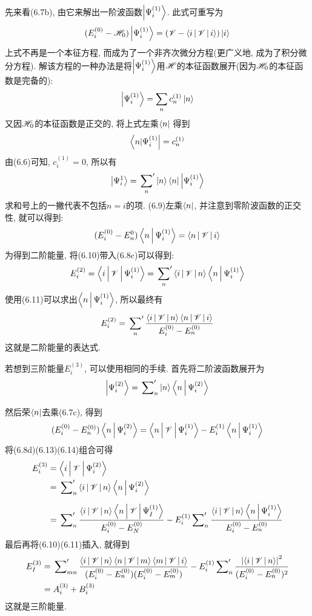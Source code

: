先来看(6.7b), 由它来解出一阶波函数$\Ket{\Psi_i^{(1)}}$. 此式可重写为
\begin{align}
(E_i^{(0)} - \mathscr{H}_0 )\Ket{\Psi_i^{(1)}} = (\mathscr{V} - \Braket{i|\mathscr{V}|i})\Ket{i}
\end{align}
上式不再是一个本征方程, 而成为了一个非齐次微分方程(更广义地, 成为了积分微分方程). 解该方程的一种办法是将$\Ket{\Psi_i^{(1)}}$用$\mathscr{H}$的本征函数展开(因为$\mathscr{H}_0$的本征函数是完备的):
\begin{align*}
\Ket{\Psi_i^{(1)}} = \sum_n c_n^{(1)}\Ket{n}
\end{align*}
又因$\mathscr{H}_0$的本征函数是正交的, 将上式左乘$\Bra{n}$ 得到
\begin{align*}
\Bra{n|\Psi_i^{(1)}} = c_n^{(1)}
\end{align*}
由(6.6)可知, $c_i^{(1)}=0$, 所以有
\begin{align}
\Ket{\Psi_i^{1}} = \sideset{}{'}\sum_n\Ket{n}\Bra{n}\Ket{\Psi_i^{(1)}}
\end{align}
求和号上的一撇代表不包括$n=i$的项. (6.9)左乘$\Bra{n}$, 并注意到零阶波函数的正交性, 就可以得到:
\begin{align}
(E_i^{(0)} - E_n^{0} )\Braket{n|\Psi_i^{(1)}} = \Braket{n|\mathscr{V}|i}
\end{align}
为得到二阶能量, 将(6.10)带入(6.8c)可以得到:
\begin{align*}
E_i^{(2)} = \Braket{i|\mathscr{V}|\Psi_i^{(1)}} = \sideset{}{'}\sum_n\Braket{i|\mathscr{V}|n}\Braket{n|\Psi_i^{(1)}}
\end{align*}
使用(6.11)可以求出$\Braket{n|\Psi_i^{(1)}}$, 所以最终有
\begin{align}
E_i^{(2)} = \sideset{}{'}\sum_n\frac{\Braket{i|\mathscr{V}|n}\Braket{n|\mathscr{V}|i}}{E_i^{(0)} - E_n^{(0)}}
\end{align}
这就是二阶能量的表达式.

若想到三阶能量$E_i^{(3)}$, 可以使用相同的手续. 首先将二阶波函数展开为
\begin{align}
\Ket{\Psi_i^{(2)}} = \sideset{}{'}{\sum_n}\Ket{n}\Braket{n|\Psi_i^{(2)}}
\end{align}
然后荣$\Bra{n}$去乘(6.7c), 得到
\begin{align}
(E_i^{(0)} -E_n^{(0)} )\Braket{n|\Psi_i^{(2)}} = \Braket{n|\mathscr{V}|\Psi_i^{(1)}} - E_i^{(1)}\Braket{n|\Psi_i^{(1)}}
\end{align}
将(6.8d)(6.13)(6.14)组合可得
\begin{align*}
E_i^{(3)} & = \Braket{i|\mathscr{V}|\Psi_i^{(2)}}\\
		  & = \sideset{}{'}{\sum_n}\Braket{i|\mathscr{V}|n}\Braket{n|\Psi_i^{(2)}}\\
		  & =\sideset{}{'}{\sum_n}\frac{\Braket{i|\mathscr{V}|n}\Braket{n|\mathscr{V}|\Psi_I^{(1)}}}{E_i^{(0)} - E_N^{(0)}} - E_i^{(1)} \sideset{}{'}{\sum_n}\frac{\Braket{i|\mathscr{V}|n}\Braket{n|\Psi_i^{(1)}}}{E_i^{(0)} - E_n^{(0)} }
\end{align*}
最后再将(6.10)(6.11)插入, 就得到
\begin{align}
E_I^{(3)} & =\sideset{}{'}{\sum_{mn}}\frac{\Braket{i|\mathscr{V}|n}\Braket{n|\mathscr{V}|m}\Braket{m|\mathscr{V}|i} }{(E_i^{(0)} -E_n^{(0)})(E_i^{(0)} - E_m^{(0)} )  } - E_i^{(1)} \sideset{}{'}{\sum_n} \frac{\left| \Braket{i|\mathscr{V}|n} \right|^2}{(E_i^{(0)} -E_n^{(0)} )^2}\notag\\
& = A_i^{(3)} + B_i^{(3)}
\label{6.15}
\end{align}
这就是三阶能量.

